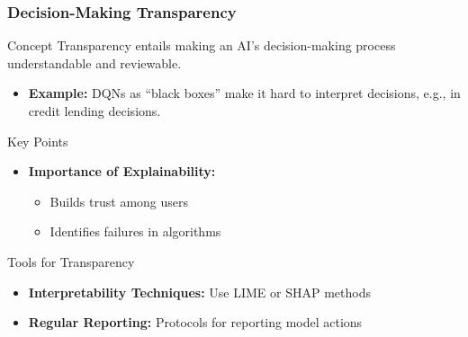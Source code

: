 \documentclass[aspectratio=169]{beamer}
\begin{document}
\begin{frame}[fragile]
    \frametitle{Decision-Making Transparency}
    \begin{block}{Concept}
        Transparency entails making an AI's decision-making process understandable and reviewable.
    \end{block}
    
    \begin{itemize}
        \item \textbf{Example:} DQNs as “black boxes” make it hard to interpret decisions, e.g., in credit lending decisions.
    \end{itemize}
    
    \begin{block}{Key Points}
        \begin{itemize}
            \item \textbf{Importance of Explainability:}
            \begin{itemize}
                \item Builds trust among users
                \item Identifies failures in algorithms
            \end{itemize}
        \end{itemize}
    \end{block}

    \begin{block}{Tools for Transparency}
        \begin{itemize}
            \item \textbf{Interpretability Techniques:} Use LIME or SHAP methods
            \item \textbf{Regular Reporting:} Protocols for reporting model actions
        \end{itemize}
    \end{block}
    
\end{frame}
\end{document}
